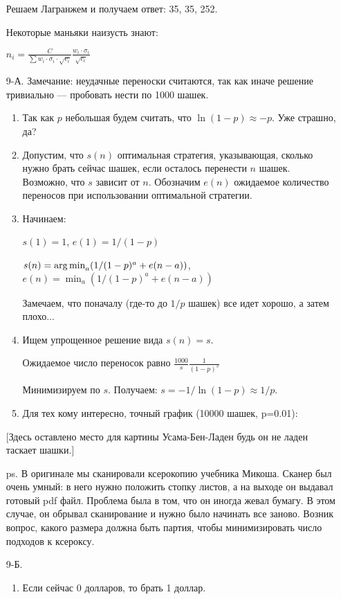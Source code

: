 \begin{enumerate}
Решаем Лагранжем и получаем ответ: 35, 35, 252.

Некоторые маньяки наизусть знают:

$n_{i}=\frac{C}{\sum w_{i}\cdot \sigma_{i}\cdot\sqrt{c_{i}}}\frac{w_{i}\cdot \sigma_{i}}{\sqrt{c_{i}}}$
\item[9-А.] Замечание: неудачные переноски считаются, так как иначе решение тривиально — пробовать нести по 1000 шашек.
\begin{enumerate}
\item  Так как $p$ небольшая будем считать, что $\ln(1-p)\approx -p$. Уже страшно, да?
\item Допустим, что $s(n)$ оптимальная стратегия, указывающая, сколько нужно брать сейчас шашек, если осталось перенести $n$ шашек. Возможно, что $s$ зависит от $n$.
Обозначим $e(n)$ ожидаемое количество переносов при использовании оптимальной стратегии.
\item Начинаем:

$s(1)=1$, $e(1)=1/(1-p)$

$s(n)=\operatorname*{arg\,min}_{a}(1/(1-p)^{a}+e(n-a))$, $e(n)=\min_{a}(1/(1-p)^{a}+e(n-a))$

Замечаем, что поначалу (где-то до $1/p$ шашек) все идет хорошо, а затем плохо...
\item Ищем упрощенное решение вида $s(n)=s$.

Ожидаемое число переносок равно $\frac{1000}{s}\frac{1}{(1-p)^{s}}$

Минимизируем по $s$. Получаем: $s=-1/\ln(1-p)\approx 1/p$.
\item Для тех кому интересно, точный график (10000 шашек, p=0.01):
\end{enumerate}

$[$Здесь оставлено место для картины Усама-Бен-Ладен будь он не ладен таскает шашки.$]$

ps. В оригинале мы сканировали ксерокопию учебника Микоша. Сканер был очень умный: в него нужно положить стопку листов, а на выходе он выдавал готовый pdf файл. Проблема была в том, что он иногда жевал бумагу. В этом случае, он обрывал сканирование и нужно было начинать все заново. Возник вопрос, какого размера должна быть партия, чтобы минимизировать число подходов к ксероксу.

\item[9-Б.]
\begin{enumerate}
\item Если сейчас 0 долларов, то брать 1 доллар.


\end{enumerate}
\end{enumerate}
